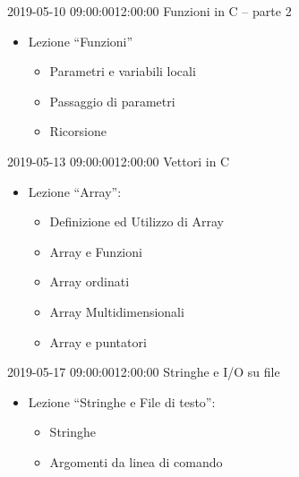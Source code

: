 \documentclass[twoside, symmetric]{tufte-book}
\begin{document}
\begin{lezione}
	{2019-05-10}
	{09:00:00}{12:00:00}
	{Funzioni in C -- parte 2}

	\begin{itemize}
		\item Lezione  ``Funzioni''
		\begin{itemize}
			\item Parametri e variabili locali
			\item Passaggio di parametri
			\item Ricorsione
		\end{itemize}
	\end{itemize}

\end{lezione}

\begin{lezione}
	{2019-05-13}
	{09:00:00}{12:00:00}
	{Vettori in C}

	\begin{itemize}
		\item Lezione ``Array'':
		\begin{itemize}
			\item Definizione ed Utilizzo di Array
			\item Array e Funzioni
			\item Array ordinati
			\item Array Multidimensionali
			\item Array e puntatori
		\end{itemize}
	\end{itemize}

\end{lezione}

\begin{lezione}
	{2019-05-17}
	{09:00:00}{12:00:00}
	{Stringhe e I/O su file}

	\begin{itemize}
		\item Lezione ``Stringhe e File di testo'':
		\begin{itemize}
			\item Stringhe
			\item Argomenti da linea di comando
		\end{itemize}
	\end{itemize}

\end{lezione}
\end{document}
